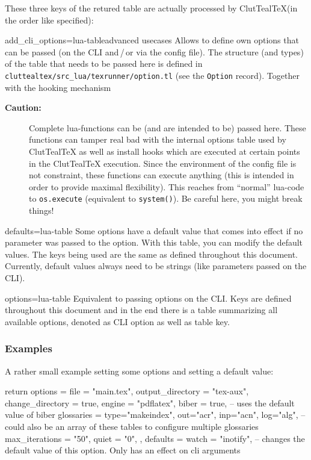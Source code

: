 \documentclass[a4paper, 11pt]{scrartcl}
\let\TeXold\TeX
\newcommand\CluttealTeX{ClutTeal\TeX\xspace}
\renewcommand\TeX{\TeXold\xspace}
\begin{document}
These three keys of the retured table are actually processed by \CluttealTeX (in the order like specified):
\begin{docKey}[configFile][
	]{add_cli_options}{=lua-table}{advanced usecases}
	Allows to define own options that can be passed (on the CLI and\,/\,or via the config file).
	The structure (and types) of the table that needs to be passed here is defined in \texttt{cluttealtex/src\_lua/texrunner/option.tl} (see the \texttt{Option} record).
	Together with the hooking mechanism 
	\begin{description}
		\item[\textcolor{CtpRed}{\bfseries\sffamily Caution:}] Complete lua-functions can be (and are intended to be) passed here.
			These functions can tamper real bad with the internal options table used by \CluttealTeX as well as install hooks which are executed at certain points in the \CluttealTeX execution.
			Since the environment of the config file is not constraint, these functions can execute anything (this is intended in order to provide maximal flexibility).
			This reaches from \enquote{normal} lua-code to \texttt{os.execute} (equivalent to \texttt{system()}).
			Be careful here, you might break things!
	\end{description}
\end{docKey}
\begin{docKey}[configFile][
	]{defaults}{=lua-table}{}
	Some options have a default value that comes into effect if no parameter was passed to the option.
	With this table, you can modify the default values.
	The keys being used are the same as defined throughout this document.
	Currently, default values always need to be strings (like parameters passed on the CLI).
\end{docKey}
\begin{docKey}[configFile][
	]{options}{=lua-table}{}
	Equivalent to passing options on the CLI.
	Keys are defined throughout this document and in the end there is a table summarizing all available options, denoted as CLI option as well as table key.
\end{docKey}

\subsubsection{Examples}
A rather small example setting some options and setting a default value:
\begin{boxcodelua}
return {
	options = {
		file = "main.tex",
		output_directory = "tex-aux",
		change_directory = true,
		engine = "pdflatex",
		biber = true, -- uses the default value of biber
		glossaries = {type="makeindex", out="acr", inp="acn", log="alg"}, -- could also be an array of these tables to configure multiple glossaries
		max_iterations = "50",
		quiet = "0",
	},
	defaults = {
		watch = "inotify", -- changes the default value of this option. Only has an effect on cli arguments 
	}
}
\end{boxcodelua}
\end{document}
